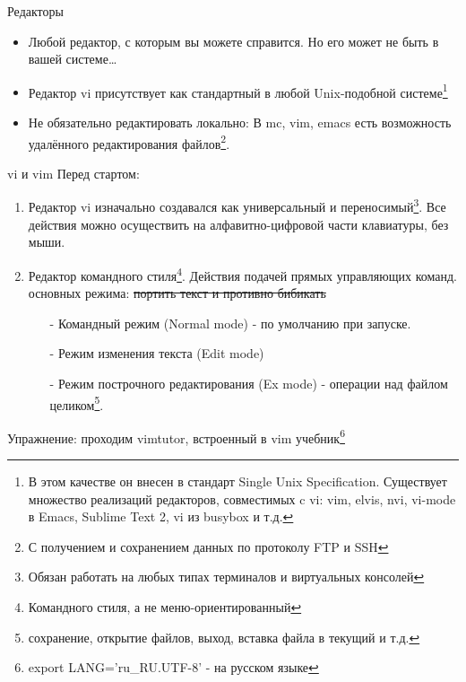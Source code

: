  \begin{frame}{Редакторы}

  \begin{itemize}
    \item  Любой редактор, с которым вы можете справится. \pause Но его может не быть в вашей системе\ldots \pause
    \item Редактор \alert{vi} присутствует как стандартный в любой Unix-подобной системе\footnote{В этом качестве он внесен в стандарт Single Unix Specification. Существует множество реализаций редакторов, совместимых c vi: vim, elvis, nvi, vi-mode в Emacs, Sublime Text 2, vi из busybox и т.д.} \pause
    \item Не обязательно редактировать локально: В \alert{mc}, \alert{vim}, \alert{emacs} есть возможность удалённого редактирования файлов\footnote{С получением и сохранением данных по протоколу FTP и SSH}.
  \end{itemize}

\end{frame}

\begin{frame}{vi и vim}
  Перед стартом:

  \begin{enumerate}
    \item  Редактор vi изначально создавался как универсальный и переносимый\footnote{Обязан работать на любых типах терминалов и виртуальных консолей}. Все действия можно осуществить на алфавитно-цифровой части клавиатуры, без мыши. \pause
    \item \alert{Редактор командного стиля}\footnote{Командного стиля, а не меню-ориентированный}. Действия подачей прямых управляющих команд. \pause {} основных режима: \sout{портить текст и противно бибикать}
      \begin{itemize}
        \item[-] \alert{Командный режим} (Normal mode) - по умолчанию при запуске.
        \item[-] \alert{Режим изменения текста} (Edit mode)
        \item[-] \alert{Режим построчного редактирования} (Ex mode) - операции над файлом целиком\footnote{сохранение, открытие файлов, выход, вставка файла в текущий и т.д.}.
      \end{itemize}
  \end{enumerate} \pause
  \alert{Упражнение}: проходим \alert{vimtutor}, встроенный в vim учебник\footnote{ export LANG='ru\_RU.UTF-8' - на русском языке }
\end{frame}

